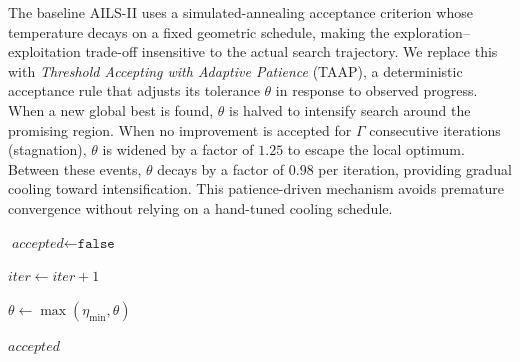 The baseline AILS-II uses a simulated-annealing acceptance criterion whose temperature decays on a fixed geometric schedule, making the exploration--exploitation trade-off insensitive to the actual search trajectory.
We replace this with \emph{Threshold Accepting with Adaptive Patience} (TAAP), a deterministic acceptance rule that adjusts its tolerance $\theta$ in response to observed progress.
When a new global best is found, $\theta$ is halved to intensify search around the promising region.
When no improvement is accepted for $\Gamma$ consecutive iterations (stagnation), $\theta$ is widened by a factor of $1.25$ to escape the local optimum.
Between these events, $\theta$ decays by a factor of $0.98$ per iteration, providing gradual cooling toward intensification.
This patience-driven mechanism avoids premature convergence without relying on a hand-tuned cooling schedule.

\begin{algorithm}[t]
\caption{Threshold Accepting with Adaptive Patience (TAAP)}
\label{alg:taap}

\BlankLine
{}

\BlankLine
$\textit{accepted} \leftarrow \texttt{false}$\;

\BlankLine
{}

\BlankLine
{}

\BlankLine
$\textit{iter} \leftarrow \textit{iter} + 1$\;

\BlankLine
{}
$\theta \leftarrow \max(\eta_{\min}, \theta)$\;

\BlankLine
\Return $\textit{accepted}$\;
\end{algorithm}
